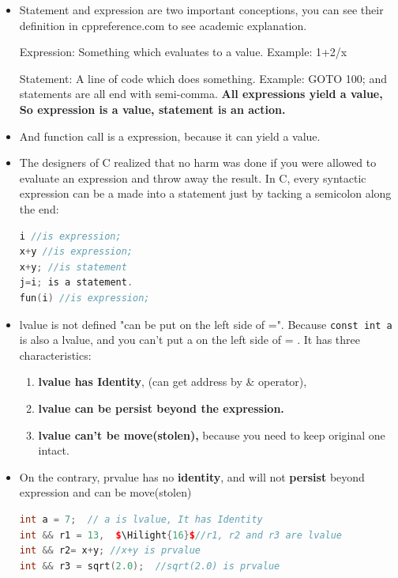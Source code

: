 \documentclass[a4paper,12pt,twoside]{book}
\newcommand{\Hilight}[1]{\makebox[0pt][l]{\color{yellow}\rule[-3pt]{#1em}{11pt}}}
\begin{document}
\begin{itemize}
\item  Statement and expression are two important conceptions, you can see their definition in cppreference.com to see academic explanation.

Expression: Something which evaluates to a value. Example: 1+2/x

Statement: A line of code which does something. Example: GOTO 100; and statements are all end with semi-comma. \textbf{All expressions yield a value, So expression is a value, statement is an action.}

\item And function call is a expression, because it can yield a value.

\item The designers of C realized that no harm was done if you were allowed to evaluate an expression and throw away the result. In C, every syntactic expression can be a made into a statement just by tacking a semicolon along the end:

\begin{lstlisting}[frame=single, language=c++]
i //is expression;
x+y //is expression;
x+y; //is statement
j=i; is a statement.
fun(i) //is expression;
\end{lstlisting}


\item lvalue is not defined "can be put on the left side of =". Because \texttt{const int a} is also a lvalue, and you can't put a on the left side of = . It has three characteristics:
\begin{enumerate}
\item\textbf{ lvalue has Identity}, (can get address by \& operator),
\item \textbf{lvalue can be persist beyond the expression. }
\item \textbf{lvalue can't be move(stolen),} because you need to keep original one intact.
\end{enumerate}

\item On the contrary, prvalue has no \textbf{identity}, and will not \textbf{persist} beyond expression and can be move(stolen)

\begin{lstlisting}[frame=single, language=c++, mathescape=true]
int a = 7;  // a is lvalue, It has Identity
int && r1 = 13,  $\Hilight{16}$//r1, r2 and r3 are lvalue
int && r2= x+y; //x+y is prvalue
int && r3 = sqrt(2.0);  //sqrt(2.0) is prvalue


\end{lstlisting}
\end{itemize}
\end{document}
